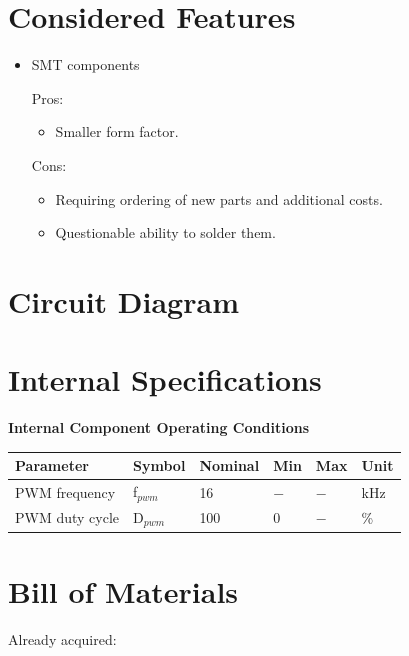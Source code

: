 \documentclass{article}
\begin{document}
\section{Considered Features}

\begin{itemize}
	\item SMT components

	Pros:
	\begin{itemize}
		\item Smaller form factor.
	\end{itemize}
	Cons:
	\begin{itemize}
		\item Requiring ordering of new parts and additional costs.
		\item Questionable ability to solder them.
	\end{itemize}
\end{itemize}

\section{Circuit Diagram}

\section{Internal Specifications}
\begin{center}
	\textbf{Internal Component Operating Conditions}\\
	\begin{tabular}{ |p{5cm}||p{1.5cm}|p{1.5cm}|p{1cm}|p{1cm}|p{2cm}|}
		\hline
		\textbf{Parameter}&\textbf{Symbol}&\textbf{Nominal}&\textbf{Min}&\textbf{Max}&\textbf{Unit}\\
		\hline\hline
		PWM frequency		& f$_{pwm}$	&	16	&	$-$	&	$-$	&	kHz	\\
		PWM duty cycle		& D$_{pwm}$	&	100	&	0	&	$-$	&	\%	\\
		\hline
	\end{tabular}
\end{center}



\section{Bill of Materials}
Already acquired:
\end{document}
